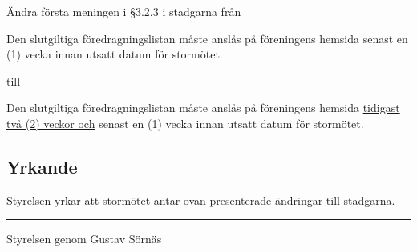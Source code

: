 \documentclass[12pt,a4paper]{article}
\newenvironment{quotationb}%
{\begin{leftbar}}%
{\end{leftbar}}
\begin{document}
Ändra första meningen i \S{}3.2.3 i stadgarna från

\begin{quotationb}
    Den slutgiltiga föredragningslistan måste anslås på föreningens hemsida
    senast en (1) vecka innan utsatt datum för stormötet.
\end{quotationb}

till 

\begin{quotationb}
    Den slutgiltiga föredragningslistan måste anslås på föreningens hemsida
    \underline{tidigast två (2) veckor och} senast en (1) vecka innan utsatt datum för stormötet.
\end{quotationb}

\subsection{Yrkande}


Styrelsen yrkar att stormötet antar ovan presenterade ändringar till stadgarna.

\noindent\rule{\linewidth}{1pt}

Styrelsen genom Gustav Sörnäs
\end{document}
